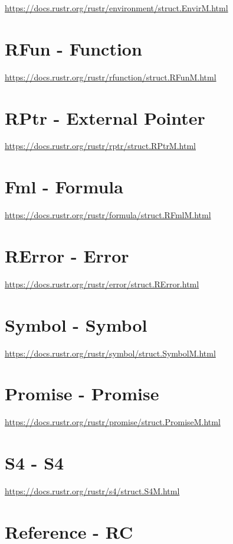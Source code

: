 \documentclass[]{book}
\begin{document}
\url{https://docs.rustr.org/rustr/environment/struct.EnvirM.html}

\section{RFun - Function}\label{rfun---function}

\url{https://docs.rustr.org/rustr/rfunction/struct.RFunM.html}

\section{RPtr - External Pointer}\label{rptr---external-pointer}

\url{https://docs.rustr.org/rustr/rptr/struct.RPtrM.html}

\section{Fml - Formula}\label{fml---formula}

\url{https://docs.rustr.org/rustr/formula/struct.RFmlM.html}

\section{RError - Error}\label{rerror---error}

\url{https://docs.rustr.org/rustr/error/struct.RError.html}

\section{Symbol - Symbol}\label{symbol---symbol}

\url{https://docs.rustr.org/rustr/symbol/struct.SymbolM.html}

\section{Promise - Promise}\label{promise---promise}

\url{https://docs.rustr.org/rustr/promise/struct.PromiseM.html}

\section{S4 - S4}\label{s4---s4}

\url{https://docs.rustr.org/rustr/s4/struct.S4M.html}

\section{Reference - RC}\label{reference---rc}
\end{document}
